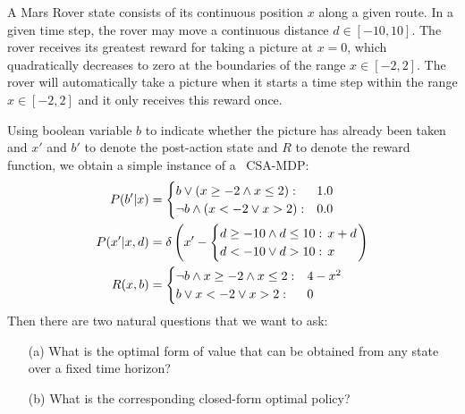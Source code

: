 \begin{example*}[\MarsRover]
\label{ex:knapsack}
A Mars Rover state consists of its continuous position $x$ along a
given route.  In a given time step, the rover may move a 
continuous distance $d \in [-10,10]$.  The rover receives its greatest
reward for taking a picture at $x=0$, which quadratically decreases
to zero at the boundaries of the range $x \in [-2,2]$.  The rover will
automatically take a picture when it starts a time step within the
range $x \in [-2,2]$ and it only receives this reward once.
\end{example*}
Using boolean variable $b$ to indicate whether the picture has
already been taken and $x'$ and $b'$ to denote the
post-action state and $R$ to denote the reward function, we obtain a
simple instance of a \MarsRover\ CSA-MDP:
\begin{align} 
P(b'|x) & = 
\begin{cases}
b \lor (x \geq -2 \land x \leq 2): & 1.0\\
\neg b \land (x < -2 \lor x > 2):  & 0.0
\end{cases} \label{eq:mr_discrete_trans} \\
P(x'|x,d) & = \delta \left( x' - \begin{cases}
d \geq -10 \land d \leq 10 : & \hspace{-2mm} x + d \\
d < -10 \lor d > 10 : & \hspace{-2mm} x
\end{cases}
\right) \label{eq:mr_cont_trans} \\
R(x,b) & = \begin{cases}
\neg b \land x \geq -2 \land x \leq 2 : & 4 - x^2 \\
b \lor x < -2 \lor x > 2 : & 0
\end{cases} \label{eq:mr_reward}
\end{align}
Then there are two natural questions that we want to ask:
\begin{enumerate}
\item[(a)] What is the optimal form of value that can be 
obtained from any state over a fixed time horizon?
\item[(b)] What is the corresponding closed-form optimal policy?
\end{enumerate}

